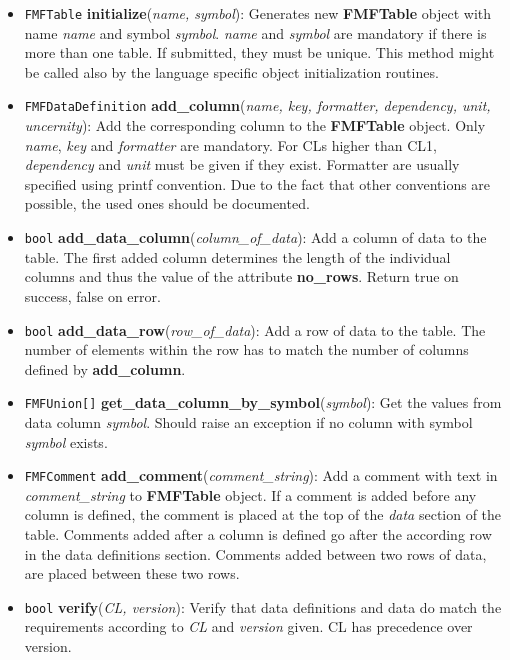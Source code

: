 \documentclass[10pt,utf8, mainlanguage=english]{ufcd-info}
\newcommand{\fret}[1]{{\texttt{#1}}}
\newcommand{\fcal}[2]{{\textbf{#1}}(\textit{#2})}
\newcommand{\fmfattr}[1]{{\textbf{#1}}}
\newcommand{\fmfobj}[1]{{\textbf{\textsf{#1}}}}
\begin{document}
\begin{itemize}
   \item \fret{FMFTable} \fcal{initialize}{name, symbol}: Generates new \fmfobj{FMFTable} object with name \textit{name} and symbol \textit{symbol}. \textit{name} and \textit{symbol} are mandatory if there is more than one table. If submitted, they must be unique. This method might be called also by the language specific object initialization routines.

	\item \fret{FMFDataDefinition} \fcal{add\_column}{name, key, formatter, dependency, unit, uncernity}: Add the corresponding column to the \fmfobj{FMFTable} object. Only \textit{name}, \textit{key} and \textit{formatter} are mandatory. For CLs higher than CL1, \textit{dependency} and \textit{unit} must be given if they exist. Formatter are usually specified using printf convention. Due to the fact that other conventions are possible, the used ones should be documented.

	\item \fret{bool} \fcal{add\_data\_column}{column\_of\_data}: Add a column of data to the table. The first added column determines the length of the individual columns and thus the value of the attribute \fmfattr{no\_rows}. Return true on success, false on error.

	\item \fret{bool} \fcal{add\_data\_row}{row\_of\_data}: Add a row of data to the table. The number of elements within the row has to match the number of columns defined by \textbf{add\_column}.
	
	\item \fret{FMFUnion[]} \fcal{get\_data\_column\_by\_symbol}{symbol}: Get the values from data column \textit{symbol}. Should raise an exception if no column with symbol \textit{symbol} exists.

	\item \fret{FMFComment} \fcal{add\_comment}{comment\_string}: Add a comment with text in \textit{comment\_string} to \fmfobj{FMFTable} object. If a comment is added before any column is defined, the comment is placed at the top of the \emph{data} section of the table. Comments added after a column is defined go after the according row in the data definitions section. Comments added between two rows of data, are placed between these two rows.

	\item \fret{bool} \fcal{verify}{CL, version}: Verify that data definitions and data do match the requirements according to \textit{CL} and \textit{version} given. CL has precedence over version.
\end{itemize}
\end{document}
